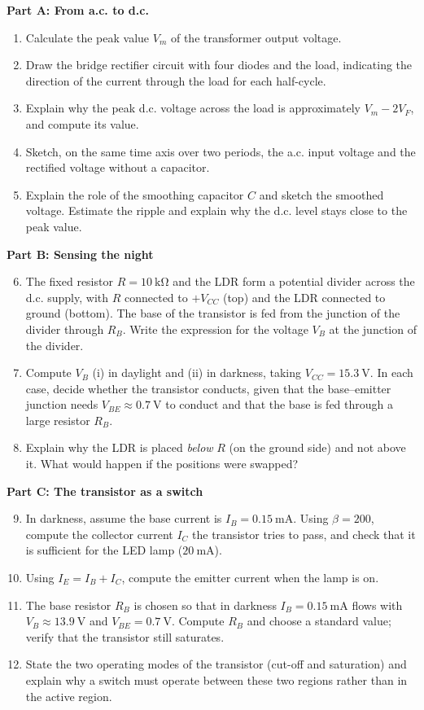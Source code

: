 \documentclass[11pt]{article}
\begin{document}
\textbf{Part A: From a.c. to d.c.}\par
\begin{enumerate}
\item Calculate the peak value $V_m$ of the transformer output voltage.
\item Draw the bridge rectifier circuit with four diodes and the load, indicating the direction of the current through the load for each half-cycle.
\item Explain why the peak d.c. voltage across the load is approximately $V_m - 2V_F$, and compute its value.
\item Sketch, on the same time axis over two periods, the a.c. input voltage and the rectified voltage without a capacitor.
\item Explain the role of the smoothing capacitor $C$ and sketch the smoothed voltage. Estimate the ripple and explain why the d.c. level stays close to the peak value.
\end{enumerate}

\textbf{Part B: Sensing the night}\par
\begin{enumerate}
\setcounter{enumi}{5}
\item The fixed resistor $R = 10\ \mathrm{k\Omega}$ and the LDR form a potential divider across the d.c. supply, with $R$ connected to $+V_{CC}$ (top) and the LDR connected to ground (bottom). The base of the transistor is fed from the junction of the divider through $R_B$. Write the expression for the voltage $V_B$ at the junction of the divider.
\item Compute $V_B$ (i) in daylight and (ii) in darkness, taking $V_{CC} = 15.3\ \mathrm{V}$. In each case, decide whether the transistor conducts, given that the base--emitter junction needs $V_{BE} \approx 0.7\ \mathrm{V}$ to conduct and that the base is fed through a large resistor $R_B$.
\item Explain why the LDR is placed \emph{below} $R$ (on the ground side) and not above it. What would happen if the positions were swapped?
\end{enumerate}

\textbf{Part C: The transistor as a switch}\par
\begin{enumerate}
\setcounter{enumi}{8}
\item In darkness, assume the base current is $I_B = 0.15\ \mathrm{mA}$. Using $\beta = 200$, compute the collector current $I_C$ the transistor tries to pass, and check that it is sufficient for the LED lamp ($20\ \mathrm{mA}$).
\item Using $I_E = I_B + I_C$, compute the emitter current when the lamp is on.
\item The base resistor $R_B$ is chosen so that in darkness $I_B = 0.15\ \mathrm{mA}$ flows with $V_B \approx 13.9\ \mathrm{V}$ and $V_{BE} = 0.7\ \mathrm{V}$. Compute $R_B$ and choose a standard value; verify that the transistor still saturates.
\item State the two operating modes of the transistor (cut-off and saturation) and explain why a switch must operate between these two regions rather than in the active region.
\end{enumerate}
\end{document}
